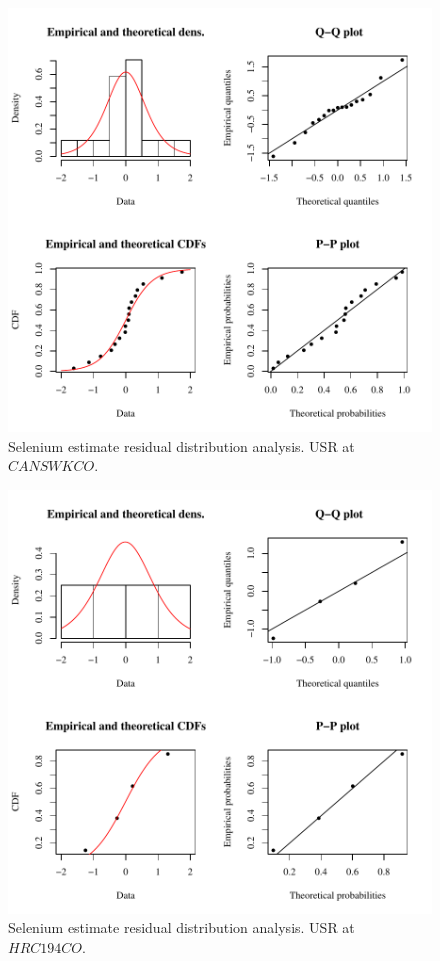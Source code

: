 \begin{figure}[htbp]
	\begin{center}
	\includegraphics[width=6in]{"Figures/Results_USR/Conc Model res-fit CAN"}
	\caption{Selenium estimate residual distribution analysis.  USR at $CANSWKCO$.}
	\end{center}
\end{figure}
\newpage

\begin{figure}[htbp]
	\begin{center}
	\includegraphics[width=6in]{"Figures/Results_USR/Conc Model res-fit HRC"}
	\caption{Selenium estimate residual distribution analysis.  USR at $HRC194CO$.}
	\end{center}
\end{figure}
\newpage

